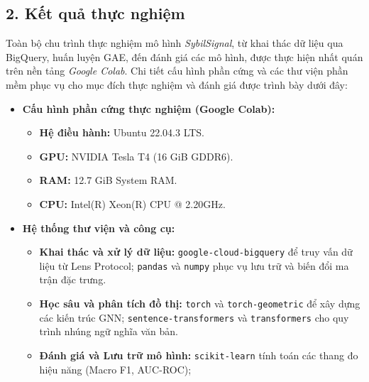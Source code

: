 \subsection{2. Kết quả thực nghiệm}

\indent\indent Toàn bộ chu trình thực nghiệm mô hình \textit{SybilSignal}, từ khai thác dữ liệu qua BigQuery, huấn luyện GAE, đến đánh giá các mô hình, được thực hiện nhất quán trên nền tảng \textit{Google Colab}. Chi tiết cấu hình phần cứng và các thư viện phần mềm phục vụ cho mục đích thực nghiệm và đánh giá được trình bày dưới đây:

\begin{itemize}[label={--}, itemsep=1pt]
    \item \textbf{Cấu hình phần cứng thực nghiệm (Google Colab):}
    \begin{itemize}[label={+}, itemsep=1pt]
        \item \textbf{Hệ điều hành:} Ubuntu 22.04.3 LTS.
        \item \textbf{GPU:} NVIDIA Tesla T4 (16 GiB GDDR6).
        \item \textbf{RAM:} 12.7 GiB System RAM.
        \item \textbf{CPU:} Intel(R) Xeon(R) CPU @ 2.20GHz.
    \end{itemize}
    
    \item \textbf{Hệ thống thư viện và công cụ:}
    \begin{itemize}[label={+}, itemsep=1pt]
        \item \textbf{Khai thác và xử lý dữ liệu:} \texttt{google-cloud-bigquery} để truy vấn dữ liệu từ Lens Protocol; \texttt{pandas} và \texttt{numpy} phục vụ lưu trữ và biến đổi ma trận đặc trưng.
        \item \textbf{Học sâu và phân tích đồ thị:} \texttt{torch} và \texttt{torch-geometric} để xây dựng các kiến trúc GNN; \texttt{sentence-transformers} và \texttt{transformers} cho quy trình nhúng ngữ nghĩa văn bản.
        \item \textbf{Đánh giá và Lưu trữ mô hình:} \texttt{scikit-learn} tính toán các thang đo hiệu năng (Macro F1, AUC-ROC);
    \end{itemize}
\end{itemize}




